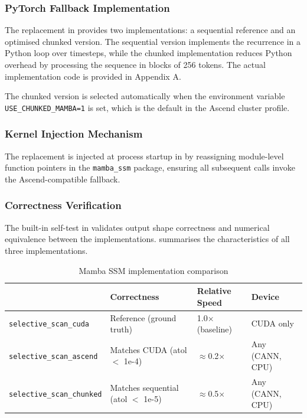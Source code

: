 \subsubsection{PyTorch Fallback Implementation}

The replacement in  provides two
implementations: a sequential reference and an optimised chunked
version. The sequential version implements the recurrence in a Python
loop over timesteps, while the chunked implementation reduces Python
overhead by processing the sequence in blocks of 256 tokens. The
actual implementation code is provided in Appendix A.

The chunked version is selected automatically when the environment
variable \texttt{USE\_CHUNKED\_MAMBA=1} is set, which is the default
in the Ascend cluster profile.

\subsubsection{Kernel Injection Mechanism}

The replacement is injected at process startup in
 by reassigning module-level function
pointers in the \texttt{mamba\_ssm} package, ensuring all subsequent
calls invoke the Ascend-compatible fallback.

\subsubsection{Correctness Verification}

The built-in self-test in  validates
output shape correctness and numerical equivalence between the
implementations.  summarises the characteristics of
all three implementations.

\begin{table}[htbp]
  \centering
  \caption{Mamba SSM implementation comparison}
  \label{tab:mamba-perf}
  \begin{tabularx}{\textwidth}{lXXX}
    \toprule
    \tableheader{Implementation & Correctness & Relative Speed & Device} \\
    \midrule
    \texttt{selective\_scan\_cuda}
      & Reference (ground truth)
      & 1.0$\times$ (baseline)
      & CUDA only \\
    \rowcolor{TableRowOdd}
    \texttt{selective\_scan\_ascend}
      & Matches CUDA (atol $<$ 1e-4)
      & $\approx$0.2$\times$
      & Any (CANN, CPU) \\
    \texttt{selective\_scan\_chunked}
      & Matches sequential (atol $<$ 1e-5)
      & $\approx$0.5$\times$
      & Any (CANN, CPU) \\
    \bottomrule
  \end{tabularx}
\end{table}

